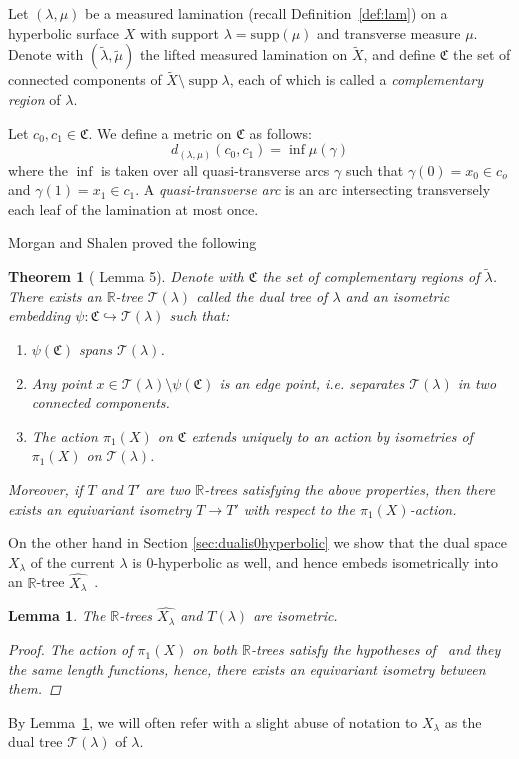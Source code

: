 \documentclass[12pt,article]{amsart}
\numberwithin{equation}{section}
\numberwithin{figure}{section}
\newtheorem{theorem}[equation]{Theorem}
\newtheorem{lemma}[equation]{Lemma}
\theoremstyle{definition}
\theoremstyle{plain}
\newcommand\R{\ensuremath{\mathbb{R}}}
\newcommand*{\wt}[1]{\widetilde{#1}}
\DeclareMathOperator{\supp}{supp}
\begin{document}
Let
$(\lambda, \mu)$ be a measured lamination (recall Definition~\ref{def:lam}) on a hyperbolic surface $X$ with support $\lambda = \mathrm{supp}(\mu)$ and transverse measure $\mu$. Denote with $(\wt{\lambda}, \tilde{\mu})$ the lifted measured lamination on $\wt{X} $, and define $\mathfrak{C}$ the set of connected components of $\wt{X} \setminus \supp \lambda$, each of which is called a \emph{complementary region} of $\lambda$.

Let $c_0, c_1 \in \mathfrak{C}$. We define a metric on $\mathfrak{C}$ as follows:
\[
d_{(\lambda, \mu)} (c_0, c_1) = \inf \mu (\gamma)
\]
where the $\inf$ is taken over all quasi-transverse arcs $\gamma$ such that $\gamma(0) = x_0 \in c_o$ and $\gamma(1) = x_1 \in c_1$. A \emph{quasi-transverse arc} is an arc intersecting transversely each leaf of the lamination at most once. 

Morgan and Shalen proved the following

 \begin{theorem}[\cite{MORGAN1991143} Lemma 5]
 \label{thm:morganinclusion}
Denote with $\mathfrak{C}$ the set of complementary regions of $\tilde{\lambda}$. There exists an $\R$-tree $\mathcal{T}(\lambda)$ called the \emph{dual tree of $\lambda$} and an isometric embedding $\psi: \mathfrak{C} \hookrightarrow \mathcal{T}(\lambda)$ such that:
\begin{enumerate}
\item $\psi(\mathfrak{C})$ spans $\mathcal{T}(\lambda)$.
\item Any point $x \in \mathcal{T}(\lambda) \setminus \psi(\mathfrak{C})$ is an edge point, i.e. separates $\mathcal{T}(\lambda)$ in two connected components.
\item The action $\pi_1 (X)$ on $\mathfrak{C}$ extends uniquely to an action by isometries of $\pi_1 (X)$ on $\mathcal{T}(\lambda)$.
\end{enumerate}

Moreover, if $T$ and $T'$ are two $\R$-trees satisfying the above properties, then there exists an equivariant isometry $T \to T'$ with respect to the $\pi_1 (X)$-action.

\end{theorem}

On the other hand in Section \ref{sec:dualis0hyperbolic} we show that the dual space $X_\lambda$ of the current $\lambda$ is $0$-hyperbolic as well, and hence embeds isometrically into an $\R$-tree $\widehat{X_\lambda}$~\cite[Theorem~3.38]{E08:Lectures}.

\begin{lemma}
\label{lem:isom_trees}
    The $\R$-trees $\widehat{X_\lambda}$ and $T(\lambda)$ are isometric.
    \begin{proof}
        The action of $\pi_1(X)$ on both $\mathbb{R}$-trees satisfy the hypotheses of~\cite[Theorem~3.7]{CM87:Groups} and they the same length functions, hence, there exists an equivariant isometry between them.
    \end{proof}
\end{lemma}
By Lemma~\ref{lem:isom_trees}, we will often refer with a slight abuse of notation to $X_\lambda$ as the dual tree $\mathcal{T}(\lambda)$ of $\lambda$.
\end{document}
